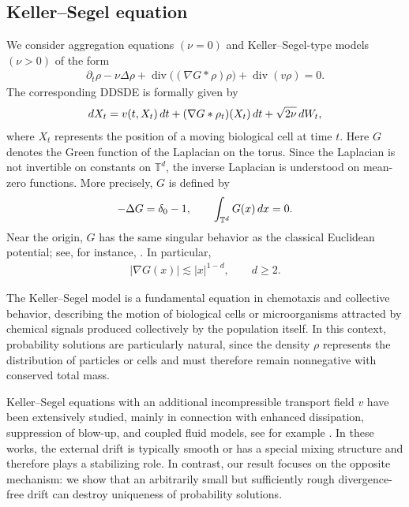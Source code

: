 \documentclass[10pt,a4paper]{amsart}
\numberwithin{equation}{section}
\def\dif{{\mathord{{\rm d}}}}
\def\geq{\geqslant}
\def\dif{{\mathord{{\rm d}}}}
\def\geq{\geqslant}
\begin{document}
 \subsection{Keller--Segel equation}\label{sec:example:kse}

We consider aggregation equations $(\nu=0)$ and Keller--Segel-type models
$(\nu>0)$ of the form
\begin{align*}
\partial_t\rho
-
\nu\Delta\rho
+
\operatorname{div}\bigl((\nabla G*\rho)\rho\bigr)
+
\operatorname{div}(v\rho)
=
0 .
\end{align*}
The corresponding DDSDE is formally given by
\begin{align}
\dif X_t
=
v(t,X_t)\,\dif t
+
(\nabla G*\rho_t)(X_t)\,\dif t
+
\sqrt{2\nu}\,\dif W_t,
\notag
\end{align}
where $X_t$ represents the position of a moving biological cell at time $t$.
Here $G$ denotes the Green function of the Laplacian on the torus. Since the
Laplacian is not invertible on constants on $\mathbb{T}^d$, the inverse
Laplacian is understood on mean-zero functions. More precisely, $G$ is defined
by
\begin{align*}
-\Delta G=\delta_0-1,
\qquad
\int_{\mathbb{T}^d}G(x)\,\dif x=0 .
\end{align*}
Near the origin, $G$ has the same singular behavior as the classical Euclidean
potential; see, for instance, \cite{Jos19}. In particular,
\begin{align*}
|\nabla G(x)|
\lesssim
|x|^{1-d},
\qquad
d\geq 2 .
\end{align*} 

The Keller--Segel model \cite{KS70,KS71} is a fundamental equation in
chemotaxis and collective behavior, describing the motion of biological cells
or microorganisms attracted by chemical signals produced collectively by the
population itself. In this context, probability solutions are particularly
natural, since the density $\rho$ represents the distribution of particles or
cells and must therefore remain nonnegative with conserved total mass.

Keller--Segel equations with an additional incompressible transport field $v$ have
been extensively studied, mainly in connection with enhanced dissipation,
suppression of blow-up, and coupled fluid models, see for example \cite{BH17,IXZ21,HKY25}. In these works, the external
drift is typically smooth or has a special mixing structure and therefore plays
a stabilizing role. In contrast, our result focuses on the opposite mechanism:
we show that an arbitrarily small but sufficiently rough divergence-free drift
can destroy uniqueness of probability solutions.  
\end{document}
